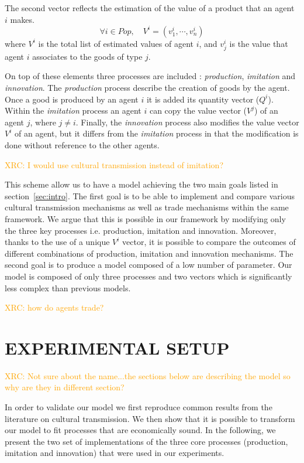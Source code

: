 \documentclass{wscpaperproc}
\newcommand{\memo}[2]{\textcolor{#1}{#2}}
\newcommand{\xrc}[1]{\memo{orange}{XRC: #1\\}}
\begin{document}
The second vector reflects the estimation of the value of a product that an agent $i$ makes.
$$\forall i \in Pop, \quad V^i = (v^i_1,\cdots,v^i_n) $$
where $V^i$ is the total list of estimated values of agent $i$, and $v^i_j$ is the value that agent $i$ associates to the goods of type $j$.

On top of these elements three processes are included : \textit{production}, \textit{imitation} and \textit{innovation}. The \textit{production} process describe the creation of goods by the agent. Once a good is produced by an agent $i$ it is added its quantity vector ($Q^i$). Within the \textit{imitation} process an agent $i$ can copy the value vector ($V^j$) of an agent $j$, where $j \neq i$. Finally, the \textit{innovation} process also modifies the value vector $V^i$ of an agent, but it differs from the \emph{imitation} process in that the modification is done without reference to the other agents. 

\xrc{I would use cultural transmission instead of imitation?}

This scheme allow us to have a model achieving the two main goals listed in section~\ref{sec:intro}. The first goal is to be able to implement and compare various cultural transmission mechanisms as well as trade mechanisms within the same framework. We argue that this is possible in our framework by modifying only the three key processes i.e. production, imitation and innovation. Moreover, thanks to the use of a unique $V^i$ vector, it is possible to compare the outcomes of different combinations of production, imitation and innovation mechanisms. The second goal is to produce a model composed of a low number of parameter. Our model is composed of only three processes and two vectors which is significantly less complex than previous models.

\xrc{how do agents trade?}

\section{EXPERIMENTAL SETUP}


\xrc{Not sure about the name...the sections below are describing the model so why are they in different section?}

In order to validate our model we first reproduce common results from the literature on cultural transmission. We then show that it is possible to transform our model to fit processes that are economically sound. In the following, we present the two set of implementations of the three core processes (production, imitation and innovation) that were used in our experiments.
\end{document}
